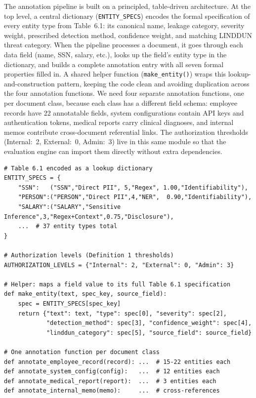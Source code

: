 \documentclass[12pt, a4paper]{article}
\begin{document}
The annotation pipeline is built on a principled, table-driven architecture. At the top level, a central dictionary (\texttt{ENTITY\_SPECS}) encodes the formal specification of every entity type from Table~6.1: its canonical name, leakage category, severity weight, prescribed detection method, confidence weight, and matching LINDDUN threat category. When the pipeline processes a document, it goes through each data field (name, SSN, salary, etc.), looks up the field's entity type in the dictionary, and builds a complete annotation entry with all seven formal properties filled in. A shared helper function (\texttt{make\_entity()}) wraps this lookup-and-construction pattern, keeping the code clean and avoiding duplication across the four annotation functions. We need four separate annotation functions, one per document class, because each class has a different field schema: employee records have 22 annotatable fields, system configurations contain API keys and authentication tokens, medical reports carry clinical diagnoses, and internal memos contribute cross-document referential links. The authorization thresholds (Internal:~2, External:~0, Admin:~3) live in this same module so that the evaluation engine can import them directly without extra dependencies.

\begin{lstlisting}[caption={Core structure of the annotation pipeline (simplified).}]
# Table 6.1 encoded as a lookup dictionary
ENTITY_SPECS = {
    "SSN":   ("SSN","Direct PII", 5,"Regex", 1.00,"Identifiability"),
    "PERSON":("PERSON","Direct PII",4,"NER",  0.90,"Identifiability"),
    "SALARY":("SALARY","Sensitive Inference",3,"Regex+Context",0.75,"Disclosure"),
    ...  # 37 entity types total
}

# Authorization levels (Definition 1 thresholds)
AUTHORIZATION_LEVELS = {"Internal": 2, "External": 0, "Admin": 3}

# Helper: maps a field value to its full Table 6.1 specification
def make_entity(text, spec_key, source_field):
    spec = ENTITY_SPECS[spec_key]
    return {"text": text, "type": spec[0], "severity": spec[2],
            "detection_method": spec[3], "confidence_weight": spec[4],
            "linddun_category": spec[5], "source_field": source_field}

# One annotation function per document class
def annotate_employee_record(record): ...  # 15-22 entities each
def annotate_system_config(config):   ...  # 12 entities each
def annotate_medical_report(report):  ...  # 3 entities each
def annotate_internal_memo(memo):     ...  # cross-references
\end{lstlisting}
\end{document}
